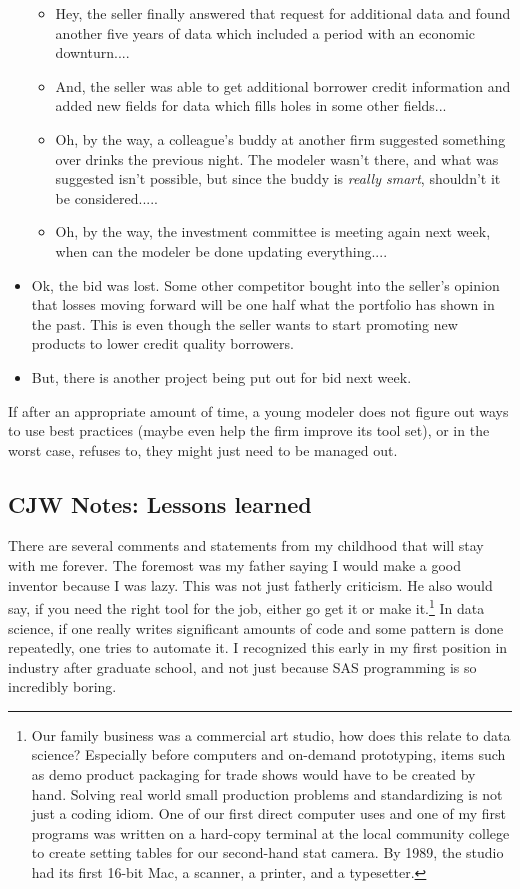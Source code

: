 \documentclass[10pt]{article}
\begin{document}
\begin{itemize}
\begin{itemize}
            \item Hey, the seller finally answered that request for additional data and 
                found another five years of data which included a period with an economic downturn....
            \item And, the seller was able to get additional borrower credit information and added new fields 
                for data which fills holes in some other fields...
            \item Oh, by the way, a colleague's buddy at another firm suggested something over drinks the previous night.
                The modeler wasn't there, and what was suggested isn't possible, but since the buddy is {\em really smart},
                shouldn't it be considered.....
            \item Oh, by the way, the investment committee is meeting again next week, when can the modeler be done updating everything....
        \end{itemize}
    \item Ok, the bid was lost. Some other competitor bought into the seller's opinion that losses moving forward will be one half 
        what the portfolio has shown in the past. This is even though the seller wants to start promoting new products to lower credit
        quality borrowers.
    \item But, there is another project being put out for bid next week.
\end{itemize}
If after an appropriate amount of time, a young modeler does not figure out ways to use best practices (maybe even
help the firm improve its tool set), or in the worst case, refuses to, they might just need to be managed out.

\subsection{CJW Notes: Lessons learned}

There are several comments and statements from my childhood that will stay with me forever.  The foremost was my father saying I would make
a good inventor because I was lazy.  This was not just fatherly criticism.  He also would say, if you need the right tool for the job,
either go get it or make it.\footnote{Our family business was a commercial art studio, how does this relate to data science?  Especially
before computers and on-demand prototyping, items such as demo product packaging for trade shows would have to be created by hand.  Solving
real world small production problems and standardizing is not just a coding idiom.  One of our first direct computer uses and one of my
first programs was written on a hard-copy terminal at the local community college to create setting tables for our second-hand stat camera.
By 1989, the studio had its first 16-bit Mac, a scanner, a printer, and a typesetter.} In data science, if one really writes significant
amounts of code and some pattern is done repeatedly, one tries to automate it.  I recognized this early in my first position in industry
after graduate school, and not just because SAS programming is so incredibly boring.
\end{document}
